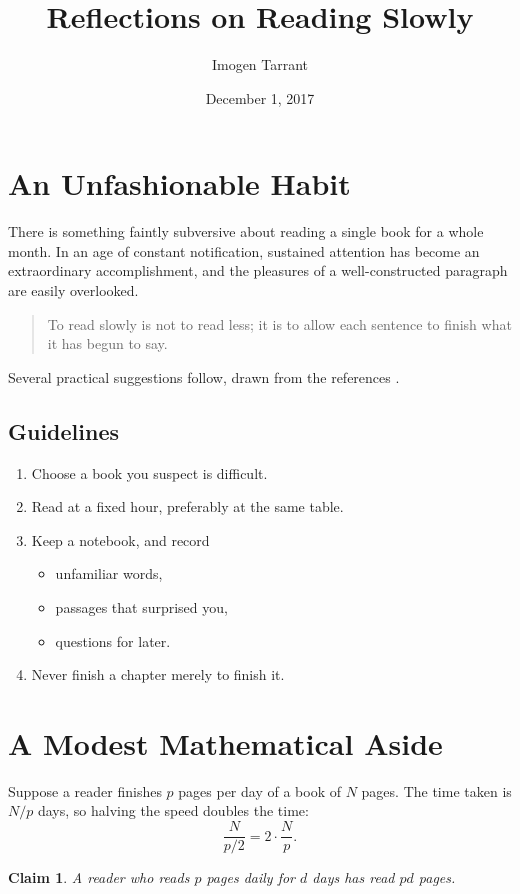 \documentclass[11pt,letterpaper]{article}
\title{Reflections on Reading Slowly}
\author{Imogen Tarrant}
\date{December 1, 2017}
\newtheorem{claim}{Claim}
\begin{document}
\maketitle

\section{An Unfashionable Habit}
There is something faintly subversive about reading a single book for a
whole month. In an age of constant notification, sustained attention has
become an extraordinary accomplishment, and the pleasures of a
well-constructed paragraph are easily overlooked.

\begin{quotation}
\noindent To read slowly is not to read less; it is to allow each sentence to
finish what it has begun to say.
\end{quotation}

Several practical suggestions follow, drawn from the references
\cite{woolf, eco}.

\subsection{Guidelines}
\begin{enumerate}
\item Choose a book you suspect is difficult.
\item Read at a fixed hour, preferably at the same table.
\item Keep a notebook, and record
  \begin{itemize}
  \item unfamiliar words,
  \item passages that surprised you,
  \item questions for later.
  \end{itemize}
\item[$\star$] Never finish a chapter merely to finish it.
\end{enumerate}

\section{A Modest Mathematical Aside}
Suppose a reader finishes $p$ pages per day of a book of $N$ pages. The time
taken is $N/p$ days, so halving the speed doubles the time:
\[
\frac{N}{p/2} = 2\cdot\frac{N}{p}.
\]
\begin{claim}
A reader who reads $p$ pages daily for $d$ days has read $pd$ pages.
\end{claim}
\end{document}
